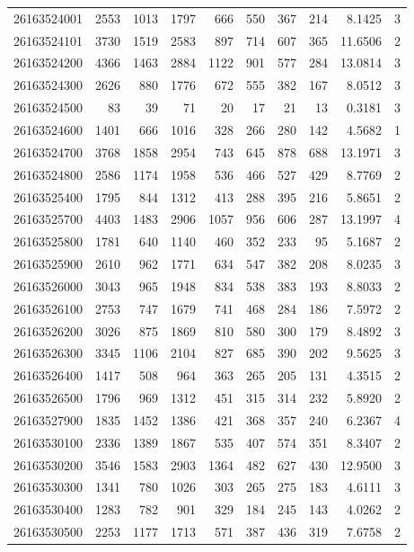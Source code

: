 \documentclass[11pt,landscape]{article}
\begin{document}
{\begin{longtable}[]{@{}lrrrrrrrrr@{}}
26163524001 & 2553 & 1013 & 1797 & 666 & 550 & 367 & 214 & 8.1425 & 3 \\
26163524101 & 3730 & 1519 & 2583 & 897 & 714 & 607 & 365 & 11.6506 & 2 \\
26163524200 & 4366 & 1463 & 2884 & 1122 & 901 & 577 & 284 & 13.0814 & 3 \\
26163524300 & 2626 & 880 & 1776 & 672 & 555 & 382 & 167 & 8.0512 & 3 \\
26163524500 & 83 & 39 & 71 & 20 & 17 & 21 & 13 & 0.3181 & 3 \\
26163524600 & 1401 & 666 & 1016 & 328 & 266 & 280 & 142 & 4.5682 & 1 \\
26163524700 & 3768 & 1858 & 2954 & 743 & 645 & 878 & 688 & 13.1971 & 3 \\
26163524800 & 2586 & 1174 & 1958 & 536 & 466 & 527 & 429 & 8.7769 & 2 \\
26163525400 & 1795 & 844 & 1312 & 413 & 288 & 395 & 216 & 5.8651 & 2 \\
26163525700 & 4403 & 1483 & 2906 & 1057 & 956 & 606 & 287 & 13.1997 & 4 \\
26163525800 & 1781 & 640 & 1140 & 460 & 352 & 233 & 95 & 5.1687 & 2 \\
26163525900 & 2610 & 962 & 1771 & 634 & 547 & 382 & 208 & 8.0235 & 3 \\
26163526000 & 3043 & 965 & 1948 & 834 & 538 & 383 & 193 & 8.8033 & 2 \\
26163526100 & 2753 & 747 & 1679 & 741 & 468 & 284 & 186 & 7.5972 & 2 \\
26163526200 & 3026 & 875 & 1869 & 810 & 580 & 300 & 179 & 8.4892 & 3 \\
26163526300 & 3345 & 1106 & 2104 & 827 & 685 & 390 & 202 & 9.5625 & 3 \\
26163526400 & 1417 & 508 & 964 & 363 & 265 & 205 & 131 & 4.3515 & 2 \\
26163526500 & 1796 & 969 & 1312 & 451 & 315 & 314 & 232 & 5.8920 & 2 \\
26163527900 & 1835 & 1452 & 1386 & 421 & 368 & 357 & 240 & 6.2367 & 4 \\
26163530100 & 2336 & 1389 & 1867 & 535 & 407 & 574 & 351 & 8.3407 & 2 \\
26163530200 & 3546 & 1583 & 2903 & 1364 & 482 & 627 & 430 & 12.9500 & 3 \\
26163530300 & 1341 & 780 & 1026 & 303 & 265 & 275 & 183 & 4.6111 & 3 \\
26163530400 & 1283 & 782 & 901 & 329 & 184 & 245 & 143 & 4.0262 & 2 \\
26163530500 & 2253 & 1177 & 1713 & 571 & 387 & 436 & 319 & 7.6758 & 2 \\

\end{longtable}}
\end{document}
